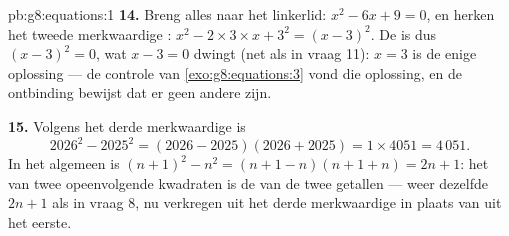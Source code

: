 \begin{solution}{pb:g8:equations:1}
\textbf{14.} Breng alles naar het linkerlid: $x^2 - 6x + 9 = 0$, en herken het
tweede merkwaardige : $x^2 - 2 \times 3 \times x + 3^2 = (x - 3)^2$. De
 is dus $(x - 3)^2 = 0$, wat $x - 3 = 0$ dwingt (net als in vraag
11): $x = 3$ is de enige oplossing --- de controle van
\cref{exo:g8:equations:3} vond die oplossing, en de ontbinding bewijst dat er
geen andere zijn.

\textbf{15.} Volgens het derde merkwaardige  is
\[
2026^2 - 2025^2 = (2026 - 2025)(2026 + 2025)
= 1 \times 4051 = 4\,051 .
\]
In het algemeen is $(n+1)^2 - n^2 = (n + 1 - n)(n + 1 + n) = 2n + 1$: het
 van twee opeenvolgende kwadraten is de  van de twee getallen --- weer
dezelfde $2n + 1$ als in vraag 8, nu verkregen uit het derde merkwaardige 
in plaats van uit het eerste.
\end{solution}
